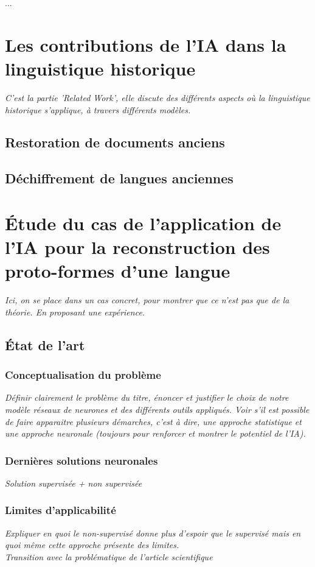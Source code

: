 \documentclass[12pt, french]{report}
\begin{document}
...

\chapter{Les contributions de l'IA dans la linguistique historique}
\textit{C'est la partie 'Related Work', elle discute des différents aspects où la linguistique historique s'applique, à travers différents modèles.}
\section{Restoration de documents anciens}
\section{Déchiffrement de langues anciennes}

\chapter{Étude du cas de l'application de l'IA pour la reconstruction des proto-formes d'une langue}
\textit{Ici, on se place dans un cas concret, pour montrer que ce n'est pas que de la théorie. En proposant une expérience.}
\section{État de l'art}
\subsection{Conceptualisation du problème}
\textit{Définir clairement le problème du titre, énoncer et justifier le choix de notre modèle réseaux de neurones et des différents outils appliqués. Voir s'il est possible de faire apparaitre plusieurs démarches, c'est à dire, une approche statistique et une approche neuronale (toujours pour renforcer et montrer le potentiel de l'IA).}

\subsection{Dernières solutions neuronales}
\textit{Solution supervisée + non supervisée}

\subsection{Limites d'applicabilité}
\textit{Expliquer en quoi le non-supervisé donne plus d'espoir que le supervisé mais en quoi même cette approche présente des limites.}\\
\textit{Transition avec la problématique de l'article scientifique}\\
\end{document}
